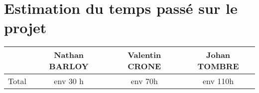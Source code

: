 \section{Estimation du temps passé sur le projet}
\begin{center}
\begin{tabular}{|c||c|c|c|}
	\hline
	& Nathan BARLOY & Valentin CRONE & Johan TOMBRE \\
	\hline
	Total & env 30 h & env 70h & env 110h \\
	\hline
\end{tabular}
\end{center}
